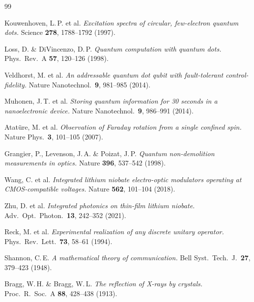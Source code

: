
\begin{thebibliography}{99}

Kouwenhoven, L.\,P. et al.
\textit{Excitation spectra of circular, few-electron quantum dots.}
Science \textbf{278}, 1788--1792 (1997).

Loss, D. \& DiVincenzo, D.\,P.
\textit{Quantum computation with quantum dots.}
Phys.\ Rev.\ A \textbf{57}, 120--126 (1998).

Veldhorst, M. et al.
\textit{An addressable quantum dot qubit with fault-tolerant control-fidelity.}
Nature Nanotechnol.\ \textbf{9}, 981--985 (2014).

Muhonen, J.\,T. et al.
\textit{Storing quantum information for 30 seconds in a nanoelectronic device.}
Nature Nanotechnol.\ \textbf{9}, 986--991 (2014).

Atatüre, M. et al.
\textit{Observation of Faraday rotation from a single confined spin.}
Nature Phys.\ \textbf{3}, 101--105 (2007).

Grangier, P., Levenson, J.\,A. \& Poizat, J.\,P.
\textit{Quantum non-demolition measurements in optics.}
Nature \textbf{396}, 537--542 (1998).

Wang, C. et al.
\textit{Integrated lithium niobate electro-optic modulators operating at
CMOS-compatible voltages.}
Nature \textbf{562}, 101--104 (2018).

Zhu, D. et al.
\textit{Integrated photonics on thin-film lithium niobate.}
Adv.\ Opt.\ Photon.\ \textbf{13}, 242--352 (2021).

Reck, M. et al.
\textit{Experimental realization of any discrete unitary operator.}
Phys.\ Rev.\ Lett.\ \textbf{73}, 58--61 (1994).

Shannon, C.\,E.
\textit{A mathematical theory of communication.}
Bell Syst.\ Tech.\ J.\ \textbf{27}, 379--423 (1948).

Bragg, W.\,H. \& Bragg, W.\,L.
\textit{The reflection of X-rays by crystals.}
Proc.\ R.\ Soc.\ A \textbf{88}, 428--438 (1913).


\end{thebibliography}
